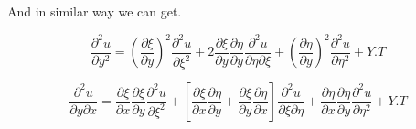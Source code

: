 And in similar way we can get.

\begin{equation}
\frac{\partial^2 u}{\partial y^2} = {(\frac{\partial\xi}{\partial y})}^2\frac{\partial^2 u}{\partial\xi^2}+2\frac{\partial\xi}{\partial y}\frac{\partial\eta}{\partial y}\frac{\partial^2 u}{\partial\eta\partial\xi}+{(\frac{\partial\eta}{\partial y})}^2\frac{\partial^2 u}{\partial\eta^2}+Y.T
\end{equation}

\begin{equation}
\frac{\partial^2 u}{\partial y\partial x} = \frac{\partial\xi}{\partial x}\frac{\partial\xi}{\partial y}\frac{\partial^2 u}{\partial\xi^2}+\left[\frac{\partial\xi}{\partial x}\frac{\partial\eta}{\partial y}+\frac{\partial\xi}{\partial y}\frac{\partial\eta}{\partial x}\right]\frac{\partial^2 u}{\partial\xi\partial\eta}+\frac{\partial\eta}{\partial x}\frac{\partial\eta}{\partial y}\frac{\partial^2 u}{\partial\eta^2} + Y.T
\end{equation}

